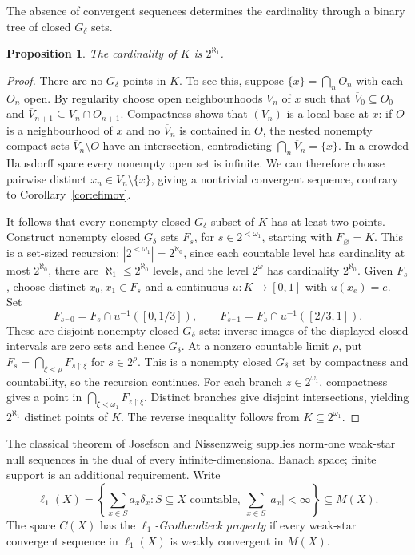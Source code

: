 \documentclass[a4paper,11pt]{amsart}
\theoremstyle{plain}
\newtheorem{proposition}[theorem]{Proposition}
\theoremstyle{definition}
\theoremstyle{remark}
\numberwithin{equation}{section}
\begin{document}
The absence of convergent sequences determines the cardinality through a binary tree of closed $G_\delta$ sets.

\begin{proposition}\label{prop:cardinality}
The cardinality of $K$ is $2^{\aleph_1}$.
\end{proposition}
\begin{proof}
There are no $G_\delta$ points in $K$. To see this, suppose $\{x\}=\bigcap_n O_n$ with each $O_n$ open. By regularity choose open neighbourhoods $V_n$ of $x$ such that $\overline V_0\subseteq O_0$ and $\overline V_{n+1}\subseteq V_n\cap O_{n+1}$. Compactness shows that $(V_n)$ is a local base at $x$: if $O$ is a neighbourhood of $x$ and no $\overline V_n$ is contained in $O$, the nested nonempty compact sets $\overline V_n\setminus O$ have an intersection, contradicting $\bigcap_n\overline V_n=\{x\}$. In a crowded Hausdorff space every nonempty open set is infinite. We can therefore choose pairwise distinct $x_n\in V_n\setminus\{x\}$, giving a nontrivial convergent sequence, contrary to Corollary~\ref{cor:efimov}.

It follows that every nonempty closed $G_\delta$ subset of $K$ has at least two points. Construct nonempty closed $G_\delta$ sets $F_s$, for $s\in2^{<\omega_1}$, starting with $F_\varnothing=K$. This is a set-sized recursion: $|2^{<\omega_1}|=2^{\aleph_0}$, since each countable level has cardinality at most $2^{\aleph_0}$, there are $\aleph_1\leqslant2^{\aleph_0}$ levels, and the level $2^\omega$ has cardinality $2^{\aleph_0}$. Given $F_s$, choose distinct $x_0,x_1\in F_s$ and a continuous $u:K\to[0,1]$ with $u(x_e)=e$. Set
\[
F_{s^\frown0}=F_s\cap u^{-1}([0,1/3]),\qquad
F_{s^\frown1}=F_s\cap u^{-1}([2/3,1]).
\]
These are disjoint nonempty closed $G_\delta$ sets: inverse images of the displayed closed intervals are zero sets and hence $G_\delta$. At a nonzero countable limit $\rho$, put $F_s=\bigcap_{\xi<\rho}F_{s\restriction\xi}$ for $s\in2^\rho$. This is a nonempty closed $G_\delta$ set by compactness and countability, so the recursion continues. For each branch $z\in2^{\omega_1}$, compactness gives a point in $\bigcap_{\xi<\omega_1}F_{z\restriction\xi}$. Distinct branches give disjoint intersections, yielding $2^{\aleph_1}$ distinct points of $K$. The reverse inequality follows from $K\subseteq2^{\omega_1}$.
\end{proof}

The classical theorem of Josefson and Nissenzweig \cite{Josefson,Nissenzweig} supplies norm-one weak-star null sequences in the dual of every infinite-dimensional Banach space; finite support is an additional requirement. Write
\[
\ell_1(X)=\left\{\sum_{x\in S}a_x\delta_x:
 S\subseteq X\text{ countable},\ \sum_{x\in S}|a_x|<\infty\right\}
\subseteq M(X).
\]
The space $C(X)$ has the \emph{$\ell_1$-Grothendieck property} if every weak-star convergent sequence in $\ell_1(X)$ is weakly convergent in $M(X)$.
\end{document}
